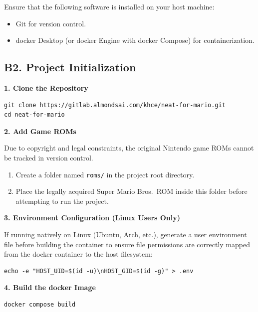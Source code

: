 Ensure that the following software is installed on your host machine:

\begin{itemize}
    \item Git for version control.
    \item docker Desktop (or docker Engine with docker Compose) for
    containerization.
\end{itemize}

\subsection*{B2. Project Initialization}

\noindent
\textbf{1. Clone the Repository}

\begin{lstlisting}
git clone https://gitlab.almondsai.com/khce/neat-for-mario.git
cd neat-for-mario
\end{lstlisting}

\noindent
\textbf{2. Add Game ROMs}

\noindent
Due to copyright and legal constraints, the original Nintendo game ROMs cannot
be tracked in version control.

\begin{enumerate}
    \item Create a folder named \texttt{roms/} in the project root directory.
    \item Place the legally acquired Super Mario Bros.\ ROM inside this folder
    before attempting to run the project.
\end{enumerate}

\noindent
\textbf{3. Environment Configuration (Linux Users Only)}

\noindent
If running natively on Linux (Ubuntu, Arch, etc.), generate a user environment
file before building the container to ensure file permissions are correctly
mapped from the docker container to the host filesystem:

\begin{lstlisting}
echo -e "HOST_UID=$(id -u)\nHOST_GID=$(id -g)" > .env
\end{lstlisting}

\noindent
\textbf{4. Build the docker Image}

\begin{lstlisting}
docker compose build
\end{lstlisting}

